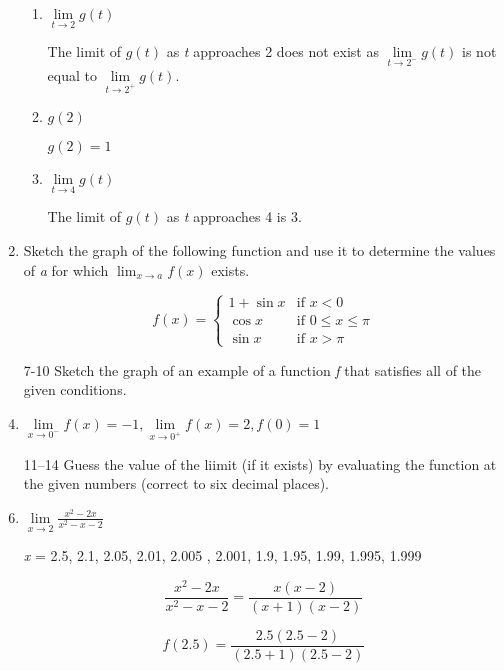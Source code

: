 \documentclass{article}
\begin{document}
\begin{enumerate}
\begin{enumerate}
					\item $\lim \limits_{t \to 2} g(t)$
					
						The limit of $g(t)$ as \emph{t} approaches 2 does not exist as 
						$\lim\limits_{t \to 2^{-}} g(t)$ is not equal to $\lim\limits_{t \to 2^{+}} g(t)$.
						
					\item $g(2)$
					
						$g(2) = 1$
						
					\item $\lim \limits_{t \to 4} g(t)$
					
						The limit of $g(t)$ as \emph{t} approaches 4 is 3.
				\end{enumerate}
				

				\item Sketch the graph of the following function and use it to determine the values of
					\emph{a} for which $\lim_{x \to a} f(x)$ exists.
					
 \begin{displaymath}
   f(x) = \left\{
     \begin{array}{ll}
       1 +\sin x & \text{if } x < 0\\
       \cos x &  \text{if } 0 \leq x \leq \pi \\
       \sin x & \text{if } x > \pi 
     \end{array}
   \right.
\end{displaymath} 

			\item[7-10] Sketch the graph of an example of a function \emph{f} that satisfies all of the 
					given conditions.
					
			\item $\lim \limits_{x \to 0^{-}} f(x) = -1, \lim \limits_{x \to 0^{+}}f(x) = 2, f(0) = 1$

			\item[11--14] Guess the value of the liimit (if it exists) by evaluating the function at the given numbers (correct to six decimal places).
			
			\item $\lim \limits_{x \to 2} \frac{x^2 - 2x}{x^2 - x - 2}$ 
			
			  \emph{x} = 2.5, 2.1, 2.05, 2.01, 2.005 , 2.001, 1.9, 1.95, 1.99, 1.995, 1.999
			  
			  $$\frac{x^2 - 2x}{x^2 - x - 2} = \frac{x(x - 2)}{(x + 1)(x - 2)}$$
			  
			  $$f(2.5) = \frac{2.5(2.5 - 2)}{(2.5 + 1)(2.5 - 2)}$$
			  

\end{enumerate}
\end{document}
